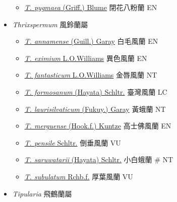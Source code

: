 \begin{itemize}
  \begin{itemize}
        \item[] \href{http://www.theplantlist.org/tpl1.1/search?q=Thelasis+pygmaea}{\textit{T. pygmaea} (Griff.) Blume}   閉花八粉蘭   EN
  \end{itemize}
 \item[] \textit{Thrixspermum} 風鈴蘭屬
                                
  \begin{itemize}
        \item[] \href{http://www.theplantlist.org/tpl1.1/search?q=Thrixspermum+annamense}{\textit{T. annamense} (Guill.) Garay}   白毛風蘭   EN
        \item[] \href{http://www.theplantlist.org/tpl1.1/search?q=Thrixspermum+eximium}{\textit{T. eximium} L.O.Williams}   異色風蘭   EN
        \item[] \href{http://www.theplantlist.org/tpl1.1/search?q=Thrixspermum+fantasticum}{\textit{T. fantasticum} L.O.Williams}   金唇風蘭   NT
        \item[] \href{http://www.theplantlist.org/tpl1.1/search?q=Thrixspermum+formosanum}{\textit{T. formosanum} (Hayata) Schltr.}   臺灣風蘭   LC
        \item[] \href{http://www.theplantlist.org/tpl1.1/search?q=Thrixspermum+laurisilvaticum}{\textit{T. laurisilvaticum} (Fukuy.) Garay}   黃蛾蘭   NT
        \item[] \href{http://www.theplantlist.org/tpl1.1/search?q=Thrixspermum+merguense}{\textit{T. merguense} (Hook.f.) Kuntze}   高士佛風蘭   EN
        \item[] \href{http://www.theplantlist.org/tpl1.1/search?q=Thrixspermum+pensile}{\textit{T. pensile} Schltr.}   倒垂風蘭   VU
        \item[] \href{http://www.theplantlist.org/tpl1.1/search?q=Thrixspermum+saruwatarii}{\textit{T. saruwatarii} (Hayata) Schltr.}   小白蛾蘭  \# NT
        \item[] \href{http://www.theplantlist.org/tpl1.1/search?q=Thrixspermum+subulatum}{\textit{T. subulatum} Rchb.f.}   厚葉風蘭   VU
  \end{itemize}
 \item[] \textit{Tipularia} 飛鶴蘭屬
                                

\end{itemize}
